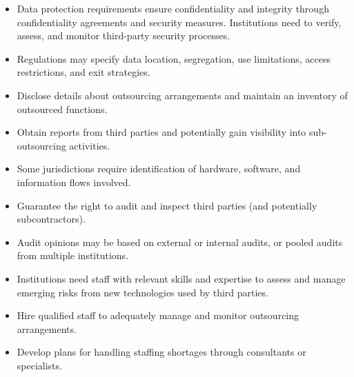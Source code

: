 \begin{itemize}
\item Data protection requirements ensure confidentiality and integrity through
confidentiality agreements and security measures. Institutions need to verify,
assess, and monitor third-party security processes.
\item Regulations may specify data location, segregation, use limitations, access
restrictions, and exit strategies.
\end{itemize}

\begin{itemize}
\item Disclose details about outsourcing arrangements and maintain an inventory
of outsourced functions.
\item Obtain reports from third parties and potentially gain visibility into
sub-outsourcing activities.
\item Some jurisdictions require identification of hardware, software, and
information flows involved.
\end{itemize}

\begin{itemize}
\item Guarantee the right to audit and inspect third parties (and potentially
subcontractors).
\item Audit opinions may be based on external or internal audits, or pooled
audits from multiple institutions.
\end{itemize}

\begin{itemize}
\item Institutions need staff with relevant skills and expertise to assess and
manage emerging risks from new technologies used by third parties.
\item Hire qualified staff to adequately manage and monitor outsourcing
arrangements.
\item Develop plans for handling staffing shortages through consultants or
specialists.
\end{itemize}
